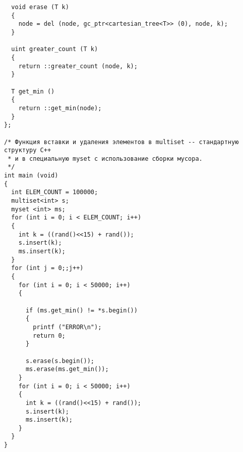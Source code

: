 \begin{lstlisting}
  void erase (T k)
  {
    node = del (node, gc_ptr<cartesian_tree<T>> (0), node, k);
  }
 
  uint greater_count (T k)
  {
    return ::greater_count (node, k);
  }
 
  T get_min ()
  {
    return ::get_min(node);
  }
};
 
/* Функция вставки и удаления элементов в multiset -- стандартную структуру С++
 * и в специальную myset с использование сборки мусора. 
 */
int main (void)
{
  int ELEM_COUNT = 100000;
  multiset<int> s;
  myset <int> ms;
  for (int i = 0; i < ELEM_COUNT; i++)
  {
    int k = ((rand()<<15) + rand());
    s.insert(k);
    ms.insert(k);
  }
  for (int j = 0;;j++)
  {
    for (int i = 0; i < 50000; i++)
    {

      if (ms.get_min() != *s.begin())
      {
        printf ("ERROR\n");
        return 0;
      }

      s.erase(s.begin());
      ms.erase(ms.get_min());
    }
    for (int i = 0; i < 50000; i++)
    {
      int k = ((rand()<<15) + rand());
      s.insert(k);
      ms.insert(k);
    }
  }
}
\end{lstlisting}